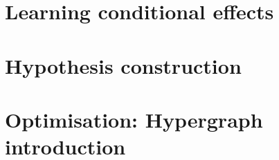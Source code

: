\documentclass[Master.tex]{subfiles}
\begin{document}


\section{Learning conditional effects}
    

\section{Hypothesis construction}
    

\section{Optimisation: Hypergraph introduction}\label{sec:ca:hgintro}
    

% 	
%
%     
%
% 	
%
% 	
\end{document}
